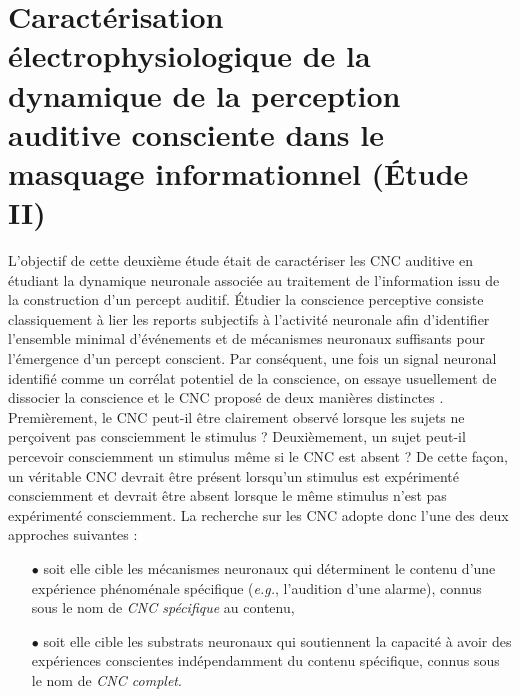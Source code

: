 \section[Caractérisation électrophysiologique de la perception consciente (Étude II)]{Caractérisation électrophysiologique de la dynamique de la perception auditive consciente dans le masquage informationnel (Étude II)}

L'objectif de cette deuxième étude était de caractériser les CNC auditive en étudiant la dynamique neuronale associée au traitement de l'information issu de la construction d'un percept auditif. 
Étudier la conscience perceptive consiste classiquement à lier les reports subjectifs à l'activité neuronale afin d'identifier l'ensemble minimal d'événements et de mécanismes neuronaux suffisants pour l'émergence d'un percept conscient.  
Par conséquent, une fois un signal neuronal identifié comme un corrélat potentiel de la conscience, on essaye usuellement de dissocier la conscience et le CNC proposé de deux manières distinctes \citep{dembski2021perceptual}. 
Premièrement, le CNC peut-il être clairement observé lorsque les sujets ne perçoivent pas consciemment le stimulus ? 
Deuxièmement, un sujet peut-il percevoir consciemment un stimulus même si le CNC est absent ? 
De cette façon, un véritable CNC devrait être présent lorsqu'un stimulus est expérimenté consciemment et devrait être absent lorsque le même stimulus n'est pas expérimenté consciemment. 
La recherche sur les CNC adopte donc l'une des deux approches suivantes : 

\begin{itemize}
\item[$\bullet$] soit elle cible les mécanismes neuronaux qui déterminent le contenu d'une expérience phénoménale spécifique (\textit{e.g.}, l'audition d'une alarme), connus sous le nom de \emph{CNC spécifique} au contenu, 
\item[$\bullet$] soit elle cible les substrats neuronaux qui soutiennent la capacité à avoir des expériences conscientes indépendamment du contenu spécifique, connus sous le nom de \emph{CNC complet}. 
\end{itemize}

